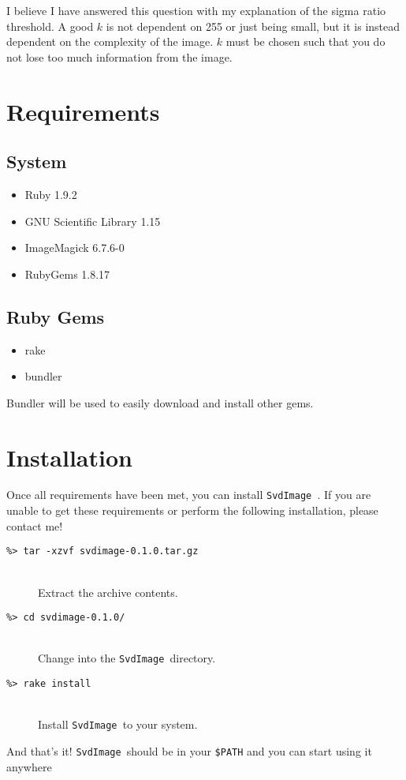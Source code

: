 \documentclass[12pt,letterpaper]{article}
\newcommand{\svdimage}{\texttt{SvdImage }}
\newcommand{\codeitem}[2]{\item[\texttt{\%> #1}] \hfill \\ #2}
\begin{document}
I believe I have answered this question with my explanation of the sigma ratio threshold. A good $k$ is not
dependent on 255 or just being small, but it is instead dependent on the
complexity of the image. $k$ must be chosen such that you do not lose too much
information from the image.

\section{Requirements}
\subsection{System}
\begin{itemize}
\item Ruby 1.9.2
\item GNU Scientific Library 1.15
\item ImageMagick 6.7.6-0
\item RubyGems 1.8.17
\end{itemize}
\subsection{Ruby Gems}
\begin{itemize}
\item rake
\item bundler
\end{itemize}
Bundler will be used to easily download and install other gems.

\section{Installation}
Once all requirements have been met, you can install \svdimage. If you are
unable to get these requirements or perform the following installation, please
contact me!
\begin{description}
\codeitem{tar -xzvf svdimage-0.1.0.tar.gz}{Extract the archive contents.}
\codeitem{cd svdimage-0.1.0/}{Change into the \svdimage directory.}
\codeitem{rake install}{Install \svdimage to your system.}
\end{description}
And that's it! \svdimage should be in your \texttt{\$PATH} and you can start
using it anywhere
\end{document}
